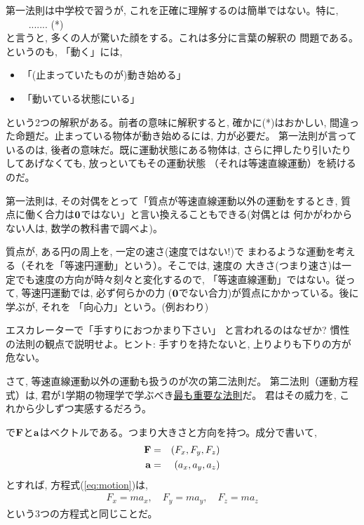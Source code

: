 第一法則は中学校で習うが, これを正確に理解するのは簡単ではない。特に, \\
　　 ....... (*)\\
と言うと, 多くの人が驚いた顔をする。これは多分に言葉の解釈の
問題である。というのも, 「動く」には, 
\begin{itemize}
\item 「(止まっていたものが)動き始める」
\item 「動いている状態にいる」
\end{itemize}
という2つの解釈がある。前者の意味に解釈すると, 確かに(*)はおかしい, 
間違った命題だ。止まっている物体が動き始めるには, 力が必要だ。
第一法則が言っているのは, 後者の意味だ。既に運動状態にある物体は, 
さらに押したり引いたりしてあげなくても, 放っといてもその運動状態
（それは等速直線運動）を続けるのだ。\mv

第一法則は, その対偶をとって「質点が等速直線運動以外の運動をするとき, 
質点に働く合力は${\bf 0}$ではない」と言い換えることもできる(対偶とは
何かがわからない人は, 数学の教科書で調べよ)。

\begin{exmpl} 質点が, ある円の周上を, 一定の速さ(速度ではない!)で
まわるような運動を考える（それを「等速円運動」という）。そこでは, 速度の
大きさ(つまり速さ)は一定でも速度の方向が時々刻々と変化するので, 
「等速直線運動」ではない。従って, 等速円運動では, 必ず何らかの力
(${\bf 0}$でない合力)が質点にかかっている。後に学ぶが, それを
「向心力」という。(例おわり)\end{exmpl}

\begin{q}\label{q:escalator} エスカレーターで「手すりにおつかまり下さい」
と言われるのはなぜか? 慣性の法則の観点で説明せよ。ヒント: 手すりを持たないと, 
上りよりも下りの方が危ない。\end{q}\mv

さて, 等速直線運動以外の運動も扱うのが次の第二法則だ。
第二法則（運動方程式）は, 君が1学期の物理学で学ぶべき\underline{最も重要な法則}だ。
君はその威力を, これから少しずつ実感するだろう。

で${\bf F}$と${\bf a}$はベクトルである。つまり大きさと方向を持つ。成分で書いて, 
\begin{eqnarray}
{\bf F}&=&(F_x, F_y, F_z)\\
{\bf a}&=&(a_x, a_y, a_z)
\end{eqnarray}
とすれば, 方程式(\ref{eq:motion})は, 
\begin{eqnarray}
F_x=ma_x,\quad
F_y=ma_y, \quad
F_z=ma_z
\end{eqnarray}
という3つの方程式と同じことだ。

